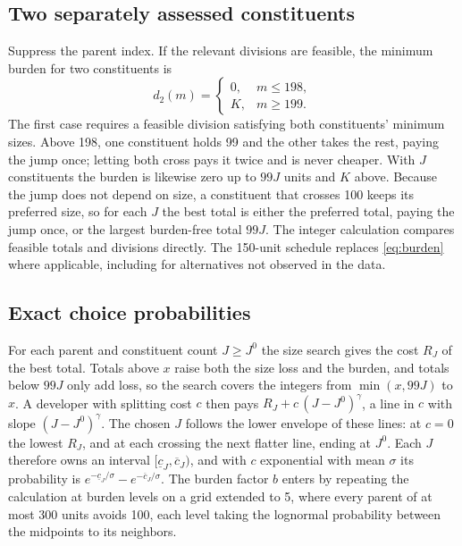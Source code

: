 \documentclass[11pt]{article}
\begin{document}
\subsection{Two separately assessed constituents}
Suppress the parent index. If the relevant divisions are feasible, the minimum burden for two constituents is
\begin{equation}
d_2(m)=
\begin{cases}
0,&m\le198,\\
K,&m\ge199.
\end{cases}
\label{eq:two}
\end{equation}
The first case requires a feasible division satisfying both constituents' minimum sizes. Above 198, one constituent holds 99 and the other takes the rest, paying the jump once; letting both cross pays it twice and is never cheaper. With $J$ constituents the burden is likewise zero up to $99J$ units and $K$ above. Because the jump does not depend on size, a constituent that crosses 100 keeps its preferred size, so for each $J$ the best total is either the preferred total, paying the jump once, or the largest burden-free total $99J$. The integer calculation compares feasible totals and divisions directly. The 150-unit schedule replaces \eqref{eq:burden} where applicable, including for alternatives not observed in the data.

\subsection{Exact choice probabilities}
For each parent and constituent count $J\ge J^0$ the size search gives the cost $R_J$ of the best total. Totals above $x$ raise both the size loss and the burden, and totals below $99J$ only add loss, so the search covers the integers from $\min(x,99J)$ to $x$. A developer with splitting cost $c$ then pays $R_J+c\,(J-J^0)^\gamma$, a line in $c$ with slope $(J-J^0)^\gamma$. The chosen $J$ follows the lower envelope of these lines: at $c=0$ the lowest $R_J$, and at each crossing the next flatter line, ending at $J^0$. Each $J$ therefore owns an interval $[\underline c_J,\overline c_J)$, and with $c$ exponential with mean $\sigma$ its probability is $e^{-\underline c_J/\sigma}-e^{-\overline c_J/\sigma}$. The burden factor $b$ enters by repeating the calculation at burden levels on a grid extended to 5, where every parent of at most 300 units avoids 100, each level taking the lognormal probability between the midpoints to its neighbors.
\end{document}
